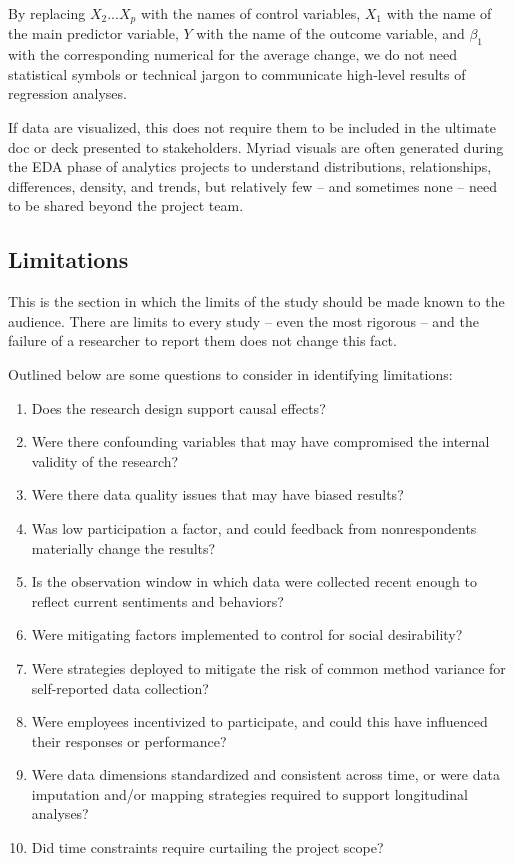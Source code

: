 \documentclass[
]{book}
\providecommand{\tightlist}{%
  \setlength{\itemsep}{0pt}\setlength{\parskip}{0pt}}
\begin{document}
By replacing \(X_2 ... X_p\) with the names of control variables, \(X_1\) with the name of the main predictor variable, \(Y\) with the name of the outcome variable, and \(\beta_1\) with the corresponding numerical for the average change, we do not need statistical symbols or technical jargon to communicate high-level results of regression analyses.

If data are visualized, this does not require them to be included in the ultimate doc or deck presented to stakeholders. Myriad visuals are often generated during the EDA phase of analytics projects to understand distributions, relationships, differences, density, and trends, but relatively few -- and sometimes none -- need to be shared beyond the project team.

\hypertarget{limitations}{%
\subsection{Limitations}\label{limitations}}

This is the section in which the limits of the study should be made known to the audience. There are limits to every study -- even the most rigorous -- and the failure of a researcher to report them does not change this fact.

Outlined below are some questions to consider in identifying limitations:

\begin{enumerate}
\def\labelenumi{\arabic{enumi}.}
\tightlist
\item
  Does the research design support causal effects?
\item
  Were there confounding variables that may have compromised the internal validity of the research?
\item
  Were there data quality issues that may have biased results?
\item
  Was low participation a factor, and could feedback from nonrespondents materially change the results?
\item
  Is the observation window in which data were collected recent enough to reflect current sentiments and behaviors?
\item
  Were mitigating factors implemented to control for social desirability?
\item
  Were strategies deployed to mitigate the risk of common method variance for self-reported data collection?
\item
  Were employees incentivized to participate, and could this have influenced their responses or performance?
\item
  Were data dimensions standardized and consistent across time, or were data imputation and/or mapping strategies required to support longitudinal analyses?
\item
  Did time constraints require curtailing the project scope?
\end{enumerate}
\end{document}
